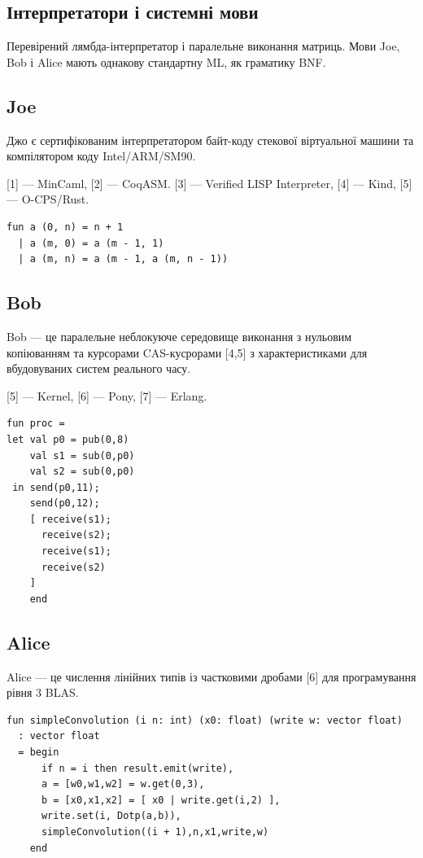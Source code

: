 \subsection*{Інтерпретатори і системні мови}

Перевірений лямбда-інтерпретатор і паралельне виконання матриць. Мови Joe,
Bob і Alice мають однакову стандартну ML, як граматику BNF.

\subsection*{Joe}

Джо є сертифікованим інтерпретатором байт-коду стекової віртуальної машини
та компілятором коду Intel/ARM/SM90.

[1] — MinCaml, [2] — CoqASM. [3] — Verified LISP Interpreter, [4] — Kind, [5] — O-CPS/Rust.

\begin{lstlisting}
fun a (0, n) = n + 1
  | a (m, 0) = a (m - 1, 1)
  | a (m, n) = a (m - 1, a (m, n - 1))
\end{lstlisting}

\newpage
\subsection*{Bob}

Bob — це паралельне неблокуюче середовище виконання з нульовим копіюванням
та курсорами CAS-кусрорами [4,5] з характеристиками для вбудовуваних систем
реального часу.

[5] — Kernel, [6] — Pony, [7] — Erlang.

\begin{lstlisting}
fun proc =
let val p0 = pub(0,8)
    val s1 = sub(0,p0)
    val s2 = sub(0,p0)
 in send(p0,11);
    send(p0,12);
    [ receive(s1);
      receive(s2);
      receive(s1);
      receive(s2)
    ]
    end
\end{lstlisting}

\subsection*{Alice}

Alice — це числення лінійних типів із частковими дробами [6] для програмування рівня 3 BLAS.

\begin{lstlisting}
fun simpleConvolution (i n: int) (x0: float) (write w: vector float)
  : vector float
  = begin
      if n = i then result.emit(write),
      a = [w0,w1,w2] = w.get(0,3),
      b = [x0,x1,x2] = [ x0 | write.get(i,2) ],
      write.set(i, Dotp(a,b)),
      simpleConvolution((i + 1),n,x1,write,w)
    end
\end{lstlisting}

